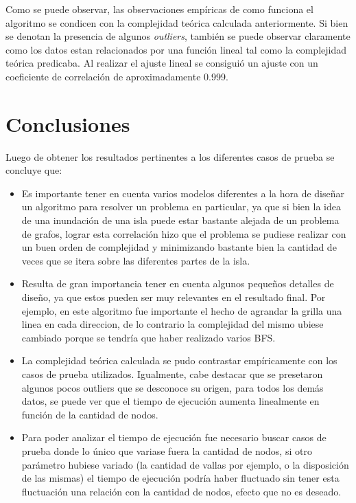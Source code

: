 \documentclass[a4paper, 12pt]{article}
\begin{document}
Como se puede observar, las observaciones emp\'iricas de como funciona el algoritmo se condicen con la complejidad te\'orica
calculada anteriormente. Si bien se denotan la presencia de algunos \emph{outliers}, tambi\'en se puede observar claramente
como los datos estan relacionados por una funci\'on lineal tal como la complejidad te\'orica predicaba. Al realizar el ajuste lineal
se consigui\'o un ajuste con un coeficiente de correlaci\'on de aproximadamente 0.999.

\section*{Conclusiones}
Luego de obtener los resultados pertinentes a los diferentes casos de prueba se concluye que:
\begin{itemize}
\item Es importante tener en cuenta varios modelos diferentes a la hora de dise\~{n}ar un algoritmo para resolver un problema
en particular, ya que si bien la idea de una inundaci\'on de una isla puede estar bastante alejada de un problema de grafos, lograr
esta correlaci\'on hizo que el problema se pudiese realizar con un buen orden de complejidad y minimizando bastante bien la cantidad de 
veces que se itera sobre las diferentes partes de la isla.
\item Resulta de gran importancia tener en cuenta algunos peque\~{n}os detalles de dise\~{n}o, ya que estos pueden ser muy
relevantes en el resultado final. Por ejemplo, en este algoritmo fue importante el hecho de agrandar la grilla una linea en cada direccion, 
de lo contrario la complejidad del mismo ubiese cambiado porque se tendr\'ia que haber realizado varios BFS.
\item La complejidad te\'orica calculada se pudo contrastar emp\'iricamente con los casos de prueba utilizados. Igualmente, 
cabe destacar que se presetaron algunos pocos outliers que se desconoce su origen, para todos los dem\'as datos, se puede ver que
el tiempo de ejecuci\'on aumenta linealmente en funci\'on de la cantidad de nodos.
\item Para poder analizar el tiempo de ejecuci\'on fue necesario buscar casos de prueba donde lo \'unico que variase fuera la cantidad de nodos,
si otro par\'ametro hubiese variado (la cantidad de vallas por ejemplo, o la disposici\'on de las mismas) el tiempo de ejecuci\'on 
podr\'ia haber fluctuado sin tener esta fluctuaci\'on una relaci\'on con la cantidad de nodos, efecto que no es deseado. 
\end{itemize}
\end{document}
